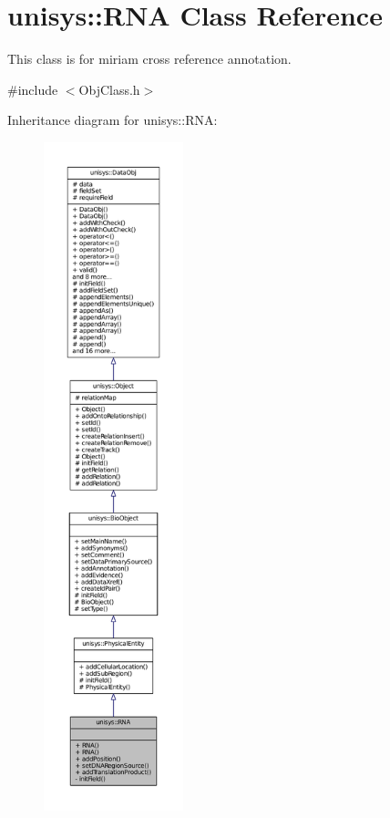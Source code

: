 \hypertarget{classunisys_1_1RNA}{\section{unisys\-:\-:R\-N\-A Class Reference}
\label{classunisys_1_1RNA}
}


This class is for miriam cross reference annotation.  




{\ttfamily \#include $<$Obj\-Class.\-h$>$}



Inheritance diagram for unisys\-:\-:R\-N\-A\-:
\nopagebreak
\begin{figure}[H]
\begin{center}
\leavevmode
\includegraphics[height=550pt]{classunisys_1_1RNA__inherit__graph}
\end{center}
\end{figure}


